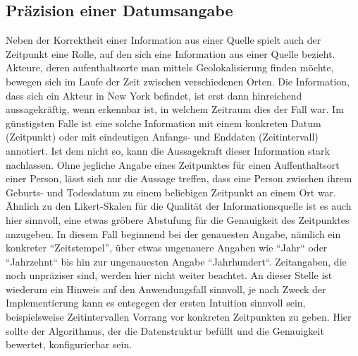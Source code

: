 \subsection{Präzision einer Datumsangabe}
Neben der Korrektheit einer Information aus einer Quelle spielt auch der Zeitpunkt eine Rolle, auf den sich eine Information aus einer Quelle bezieht. Akteure, deren aufenthaltsorte man mittels Geolokalisierung finden möchte, bewegen sich im Laufe der Zeit zwischen verschiedenen Orten. Die Information, dass sich ein Akteur in New York befindet, ist erst dann hinreichend aussagekräftig, wenn erkennbar ist, in welchem Zeitraum dies der Fall war. Im günstigsten Falle ist eine solche Information mit einem konkreten Datum (Zeitpunkt) oder mit eindeutigen Anfangs- und Enddaten (Zeitintervall) annotiert. Ist dem nicht so, kann die Aussagekraft dieser Information stark nachlassen. Ohne jegliche Angabe eines Zeitpunktes für einen Auffenthaltsort einer Person, lässt sich nur die Aussage treffen, dass eine Person zwischen ihrem Geburts- und Todesdatum zu einem beliebigen Zeitpunkt an einem Ort war. Ähnlich zu den Likert-Skalen für die Qualität der Informationsquelle ist es auch hier sinnvoll, eine etwas gröbere Abstufung für die Genauigkeit des Zeitpunktes anzugeben. In diesem Fall beginnend bei der genauesten Angabe, nämlich ein konkreter ``Zeitstempel'', über etwas ungenauere Angaben wie ``Jahr`` oder ``Jahrzehnt`` bis hin zur ungenauesten Angabe ``Jahrhundert``. Zeitangaben, die noch unpräziser sind, werden hier nicht weiter beachtet. An dieser Stelle ist wiederum ein Hinweis auf den Anwendungsfall sinnvoll, je nach Zweck der Implementierung kann es entegegen der ersten Intuition sinnvoll sein, beispielsweise Zeitintervallen Vorrang vor konkreten Zeitpunkten zu geben. Hier sollte der Algorithmus, der die Datenstruktur befüllt und die Genauigkeit bewertet, konfigurierbar sein.

